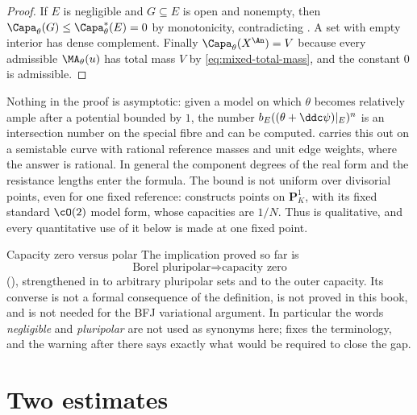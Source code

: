 \begin{proof}
If \(E\) is negligible and \(G\subseteq E\) is open and nonempty, then
\(\Capa_\theta(G)\leq\Capa_\theta^*(E)=0\) by monotonicity, contradicting
.  A set with empty interior has dense
complement.  Finally \(\Capa_\theta(X^{\An})=V\) because every admissible
\(\MA_\theta(u)\) has total mass \(V\) by
\eqref{eq:mixed-total-mass}, and the constant \(0\) is admissible.
\end{proof}

\begin{remark}
\label{rem:ch25-divisorial-explicit}
Nothing in the proof is asymptotic: given a model on which \(\theta\) becomes
relatively ample after a potential bounded by \(1\), the number
\(b_E((\theta+\ddc\psi)|_E)^n\) is an intersection number on the special
fibre and can be computed.   carries this
out on a semistable curve with rational reference masses and unit edge
weights, where the answer is rational.  In general the component degrees
of the real form and the resistance lengths enter the formula.  The bound
is not uniform over divisorial points, even for one fixed reference:
 constructs points on
\(\mathbf P^1_K\), with its fixed standard \(\cO(2)\) model form, whose
capacities are \(1/N\).  Thus 
is qualitative, and every quantitative use of it below is made at one
fixed point.
\end{remark}

\begin{warning}{Capacity zero versus polar}
The implication proved so far is
\[
       \text{Borel pluripolar}\Longrightarrow\text{capacity zero}
\]
(), strengthened in
 to arbitrary pluripolar sets and to the
outer capacity.  Its converse is not a formal consequence of the definition,
is not proved in this book, and is not needed for the BFJ variational
argument.  In particular the words \emph{negligible} and \emph{pluripolar}
are not used as synonyms here;  fixes the
terminology, and the warning after
 there says exactly what would be
required to close the gap.
\end{warning}

\section{Two estimates}
\label{sec:ch25-estimates}

